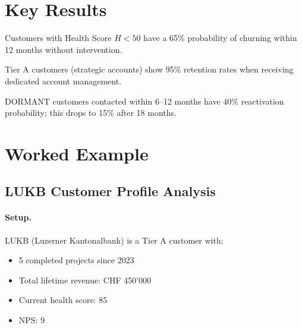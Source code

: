 \section{Key Results}
\label{sec:bp-results}

\begin{proposition}
Customers with Health Score $H < 50$ have a 65\% probability of churning
within 12 months without intervention.
\end{proposition}

\begin{proposition}
Tier A customers (strategic accounts) show 95\% retention rates when
receiving dedicated account management.
\end{proposition}

\begin{proposition}
DORMANT customers contacted within 6--12 months have 40\% reactivation
probability; this drops to 15\% after 18 months.
\end{proposition}


\section{Worked Example}
\label{sec:bp-example}

\subsection{LUKB Customer Profile Analysis}

\paragraph{Setup.} LUKB (Luzerner Kantonalbank) is a Tier A customer with:
\begin{itemize}
\item 5 completed projects since 2023
\item Total lifetime revenue: CHF 450'000
\item Current health score: 85
\item NPS: 9
\end{itemize}

